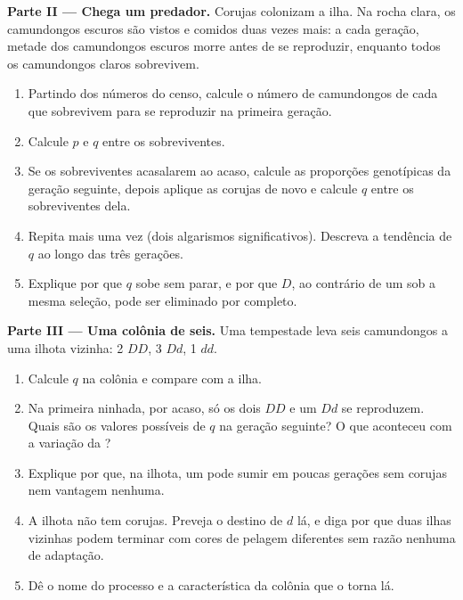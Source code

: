\begin{problem}
\medskip
\noindent\textbf{Parte II --- Chega um predador.}
Corujas colonizam a ilha. Na rocha clara, os camundongos escuros são
vistos e comidos duas vezes mais: a cada geração, metade dos
camundongos escuros morre antes de se reproduzir, enquanto todos os
camundongos claros sobrevivem.
\begin{enumerate}[resume]
  \item Partindo dos números do censo, calcule o número de camundongos
        de cada  que sobrevivem para se reproduzir na primeira
        geração.
  \item Calcule $p$ e $q$ entre os sobreviventes.
  \item Se os sobreviventes acasalarem ao acaso, calcule as proporções
        genotípicas da geração seguinte, depois aplique as corujas de
        novo e calcule $q$ entre os sobreviventes dela.
  \item Repita mais uma vez (dois algarismos significativos). Descreva
        a tendência de $q$ ao longo das três gerações.
  \item Explique por que $q$ sobe sem parar, e por que $D$, ao
        contrário de um   sob a mesma seleção, pode ser
        eliminado por completo.
\end{enumerate}

\medskip
\noindent\textbf{Parte III --- Uma colônia de seis.}
Uma tempestade leva seis camundongos a uma ilhota vizinha: 2 $DD$, 3 $Dd$, 1 $dd$.
\begin{enumerate}[resume]
  \item Calcule $q$ na colônia e compare com a ilha.
  \item Na primeira ninhada, por acaso, só os dois $DD$ e um $Dd$ se
        reproduzem. Quais são os valores possíveis de $q$ na geração
        seguinte? O que aconteceu com a variação da ?
  \item Explique por que, na ilhota, um  pode sumir em poucas
        gerações sem corujas nem vantagem nenhuma.
  \item A ilhota não tem corujas. Preveja o destino de $d$ lá, e diga
        por que duas ilhas vizinhas podem terminar com cores de pelagem
        diferentes sem razão nenhuma de adaptação.
  \item Dê o nome do processo e a característica da colônia que o torna
         lá.
\end{enumerate}


\end{problem}
